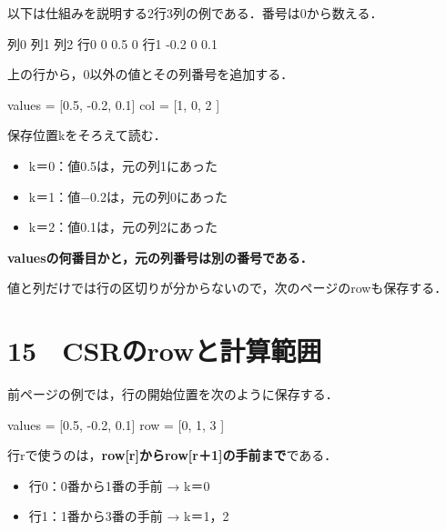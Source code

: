 \documentclass[
  14pt,
  a5paper,
]{extarticle}
\newenvironment{Shaded}{}{}
\newcommand{\NormalTok}[1]{#1}
\providecommand{\tightlist}{%
  \setlength{\itemsep}{0pt}\setlength{\parskip}{0pt}}
\begin{document}
以下は仕組みを説明する2行3列の例である．番号は0から数える．

\begin{Shaded}
\begin{Highlighting}[]
\NormalTok{        列0   列1  列2}
\NormalTok{行0      0    0.5   0}
\NormalTok{行1    {-}0.2    0   0.1}
\end{Highlighting}
\end{Shaded}

上の行から，0以外の値とその列番号を追加する．

\begin{Shaded}
\begin{Highlighting}[]
\NormalTok{values = [0.5, {-}0.2, 0.1]}
\NormalTok{col    = [1,    0,   2  ]}
\end{Highlighting}
\end{Shaded}

保存位置kをそろえて読む．

\begin{itemize}
\tightlist
\item
  k＝0：値0.5は，元の列1にあった
\item
  k＝1：値−0.2は，元の列0にあった
\item
  k＝2：値0.1は，元の列2にあった
\end{itemize}

\textbf{valuesの何番目かと，元の列番号は別の番号である．}

値と列だけでは行の区切りが分からないので，次のページのrowも保存する．

\newpage

\section{15　CSRのrowと計算範囲}\label{csrux306erowux3068ux8a08ux7b97ux7bc4ux56f2}

前ページの例では，行の開始位置を次のように保存する．

\begin{Shaded}
\begin{Highlighting}[]
\NormalTok{values = [0.5, {-}0.2, 0.1]}
\NormalTok{row    = [0,    1,   3  ]}
\end{Highlighting}
\end{Shaded}

行rで使うのは，\textbf{row{[}r{]}からrow{[}r＋1{]}の手前まで}である．

\begin{itemize}
\tightlist
\item
  行0：0番から1番の手前 → k＝0
\item
  行1：1番から3番の手前 → k＝1，2
\end{itemize}
\end{document}
